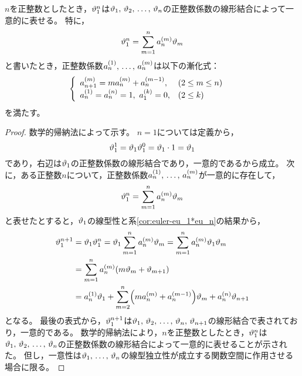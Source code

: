 \documentclass[a4paper,draft]{ltjsarticle}
\begin{document}
\begin{prop}
    $n$を正整数としたとき，$\vartheta_{1}^n$は$\vartheta_{1},\,\vartheta_{2},\,\dots,\,\vartheta_{n}$の正整数係数の線形結合によって一意的に表せる。
    特に，
    \begin{equation}
        \eu{1}^n = \sum_{m=1}^n a_{n}^{\pare{m}}\eu{m}
    \end{equation}
    と書いたとき，正整数係数$a_n^{\pare{1}},\,\dots,\, a_{n}^{\pare{m}}$は以下の漸化式：
    \begin{equation}
        \begin{cases}
            \begin{array}{ll}
                a_{n+1}^{\pare{m}}=m a_n^{\pare{m}}+a_{n}^{\pare{m-1}}, &\pare{2\leq m \leq n}
                \\
                a_n^{\pare{1}}=a_{n}^{\pare{n}}=1,\
                a_1^{\pare{k}}=0, &\pare{2\leq k}
            \end{array}
        \end{cases}
        \label{eq:euler-漸化式}
    \end{equation}
    を満たす。

    \begin{proof}
        数学的帰納法によって示す。
        $n=1$については定義から，
        \begin{equation}
            \vartheta_{1}^1=\vartheta_{1}\vartheta_{1}^0=\vartheta_{1}\cdot 1=\vartheta_{1}
        \end{equation}
        であり，右辺は$\vartheta_{1}$の正整数係数の線形結合であり，一意的であるから成立。
        次に，ある正整数$n$について，正整数係数$a_n^{\pare{1}},\,\dots,\, a_{n}^{\pare{m}}$が一意的に存在して，
        \begin{equation}
            \eu{1}^n=\sum_{m=1}^n a_n^{\pare{m}}\eu{m}
        \end{equation}
        と表せたとすると，$\vartheta_{1}$の線型性と系\ref{cor:euler-eu_1*eu_n}の結果から，
        \begin{align}
            \eu{1}^{n+1}&=\eu{1}\eu{1}^n=\eu{1}\sum_{m=1}^n a_{n}^{\pare{m}}\eu{m}=\sum_{m=1}^n a_n^{\pare{m}}\eu{1}\eu{m}
            \\
            &=\sum_{m=1}^n a_n^{\pare{m}}\pare{m\eu{m}+\eu{m+1}}
            \\
            &=a_n^{\pare{1}}\eu{1}+\sum_{m=2}^n \pare{ma_n^{\pare{m}}+a_n^{\pare{m-1}}}\eu{m}+a_{n}^{\pare{n}}\eu{n+1}
            \label{eq:euler-漸化式-pre}
        \end{align}
        となる。
        最後の表式から，$\vartheta_{1}^{n+1}$は$\vartheta_{1},\,\vartheta_{2},\,\dots,\,\vartheta_{n},\,\vartheta_{n+1}$の線形結合で表されており，一意的である。
        数学的帰納法により，$n$を正整数としたとき，$\vartheta_{1}^n$は$\vartheta_{1},\,\vartheta_{2},\,\dots,\,\vartheta_{n}$の正整数係数の線形結合によって一意的に表せることが示された。
        但し，一意性は$\vartheta_{1},\,\dots,\,\vartheta_{n}$の線型独立性が成立する関数空間に作用させる場合に限る。


\end{proof}
\end{prop}
\end{document}
